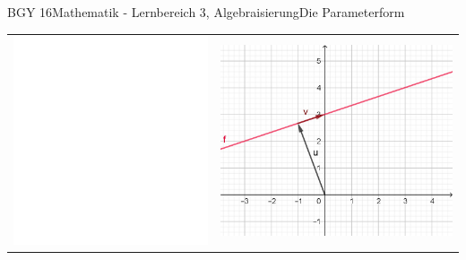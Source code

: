 \documentclass[oneside,openany,headings=optiontotoc,11pt,numbers=noenddot]{scrreprt}
\begin{document}
\begin{worksheet}{BGY 16}{Mathematik - Lernbereich 3, Algebraisierung}{Die Parameterform}
\begin{framed}
\begin{center}
\begin{tabularx}{\textwidth}{Xr}
					\includegraphics[scale=0.33]{../empty.jpg} & \includegraphics[scale=0.33]{Bilder/GeradeVektor.jpg}
				\end{tabularx}
			\end{center}
		\end{framed}
	\end{worksheet}
\end{document}
